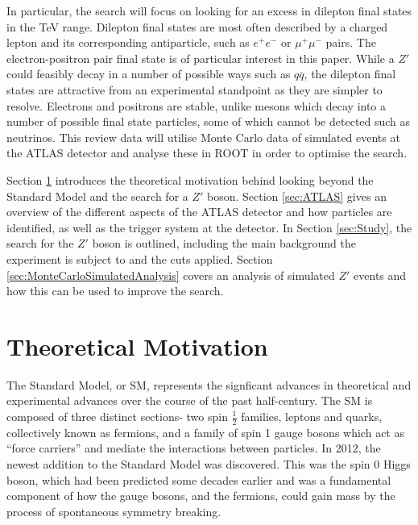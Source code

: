 \documentclass{article}
\begin{document}
In particular, the search will focus on looking for an excess in dilepton final states in the TeV range. Dilepton final states are most often described by a charged lepton and its corresponding antiparticle, such as $e^+e^-$ or $\mu^+\mu^-$ pairs. The electron-positron pair final state is of particular interest in this paper. While a $Z'$ could feasibly decay in a number of possible ways such as $q\overline{q}$, the dilepton final states are attractive from an experimental standpoint as they are simpler to resolve. Electrons and positrons are stable, unlike mesons which decay into a number of possible final state particles, some of which cannot be detected such as neutrinos. This review data will utilise Monte Carlo data of simulated events at the ATLAS detector and analyse these in ROOT \cite{ROOT} in order to optimise the search.

Section \ref{sec:TheoreticalMotication} introduces the theoretical motivation behind looking beyond the Standard Model and the search for a $Z'$ boson. Section \ref{sec:ATLAS} gives an overview of the different aspects of the ATLAS detector and how particles are identified, as well as the trigger system at the detector. In Section \ref{sec:Study}, the search for the $Z'$ boson is outlined, including the main background the experiment is subject to and the cuts applied. Section \ref{sec:MonteCarloSimulatedAnalysis} covers an analysis of simulated $Z'$ events and how this can be used to improve the search.

\section{Theoretical Motivation}%
\label{sec:TheoreticalMotication}

The Standard Model, or SM, represents the signficant advances in theoretical and experimental advances over the course of the past half-century. The SM is composed of three distinct sections- two spin $\frac{1}{2}$ families, leptons and quarks, collectively known as fermions, and a family of spin 1 gauge bosons which act as ``force carriers'' and mediate the interactions between particles. In 2012, the newest addition to the Standard Model was discovered. This was the spin 0 Higgs boson, which had been predicted some decades earlier and was a fundamental component of how the gauge bosons, and the fermions, could gain mass by the process of spontaneous symmetry breaking. 
\end{document}
